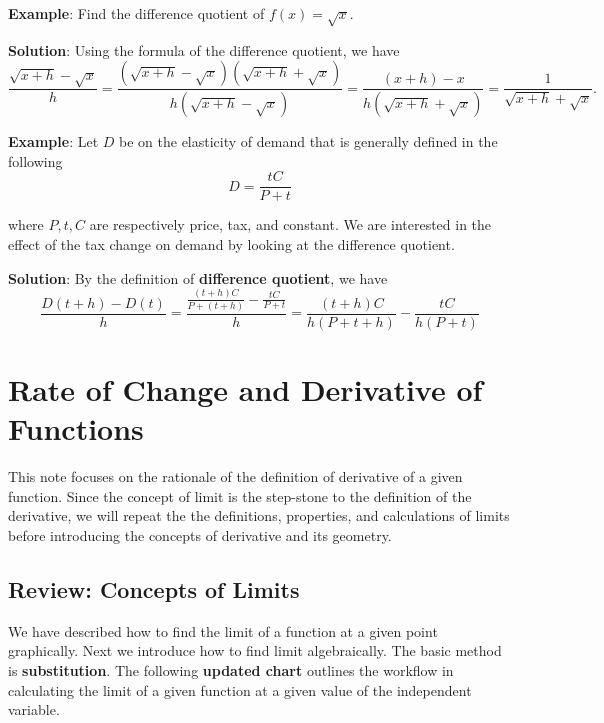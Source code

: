 \documentclass[
]{book}
\begin{document}
\textbf{Example}: Find the difference quotient of \(f(x) = \sqrt{x}\).

\textbf{Solution}: Using the formula of the difference quotient, we have
\[
\frac{\sqrt{x+h}-\sqrt{x}}{h} = \frac{(\sqrt{x+h}-\sqrt{x})(\sqrt{x+h}+\sqrt{x})}{h(\sqrt{x+h}-\sqrt{x})} = \frac{(x+h)-x}{{h(\sqrt{x+h}+\sqrt{x})}} = \frac{1}{\sqrt{x+h}+\sqrt{x}}.
\]

\textbf{Example}: Let \(D\) be on the elasticity of demand that is generally defined in the following
\[
D = \frac{tC}{P + t}
\]

where \(P,t, C\) are respectively price, tax, and constant. We are interested in the effect of the tax change on demand by looking at the difference quotient.

\textbf{Solution}: By the definition of \textbf{difference quotient}, we have
\[
\frac{D(t+h) - D(t)}{h} = \frac{\frac{(t+h)C}{P+(t+h)}-\frac{tC}{P+t}}{h} = \frac{(t+h)C}{h(P+t+h)}-\frac{tC}{h(P+t)}
\]

\hypertarget{rate-of-change-and-derivative-of-functions}{%
\chapter{Rate of Change and Derivative of Functions}\label{rate-of-change-and-derivative-of-functions}}

This note focuses on the rationale of the definition of derivative of a given function. Since the concept of limit is the step-stone to the definition of the derivative, we will repeat the the definitions, properties, and calculations of limits before introducing the concepts of derivative and its geometry.

\hypertarget{review-concepts-of-limits}{%
\section{Review: Concepts of Limits}\label{review-concepts-of-limits}}

We have described how to find the limit of a function at a given point graphically. Next we introduce how to find limit algebraically. The basic method is \textbf{substitution}. The following \textbf{\color{red}updated chart} outlines the workflow in calculating the limit of a given function at a given value of the independent variable.
\end{document}
